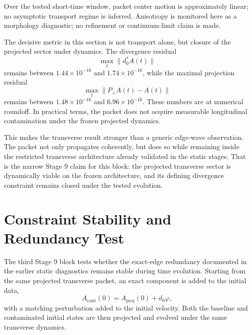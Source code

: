 \documentclass[11pt]{article}
\begin{document}
Over the tested short-time window, packet center motion is approximately linear; no asymptotic transport regime is inferred. Anisotropy is monitored here as a morphology diagnostic; no refinement or continuum-limit claim is made.

The decisive metric in this section is not transport alone, but closure of the projected sector under dynamics. The divergence residual
\begin{equation}
\max_t \|d_0^{*}A(t)\|
\end{equation}
remains between $1.44\times 10^{-16}$ and $1.74\times 10^{-16}$, while the maximal projection residual
\begin{equation}
\max_t \|P_{\perp}A(t)-A(t)\|
\end{equation}
remains between $1.48\times 10^{-16}$ and $6.96\times 10^{-16}$. These numbers are at numerical roundoff. In practical terms, the packet does not acquire measurable longitudinal contamination under the frozen projected dynamics.

This makes the transverse result stronger than a generic edge-wave observation. The packet not only propagates coherently, but does so while remaining inside the restricted transverse architecture already validated in the static stages. That is the narrow Stage 9 claim for this block: the projected transverse sector is dynamically viable on the frozen architecture, and its defining divergence constraint remains closed under the tested evolution.

\section{Constraint Stability and Redundancy Test}
The third Stage 9 block tests whether the exact-edge redundancy documented in the earlier static diagnostics remains stable during time evolution. Starting from the same projected transverse packet, an exact component is added to the initial data,
\begin{equation}
A_{\mathrm{cont}}(0) = A_{\mathrm{proj}}(0) + d_0\varphi,
\end{equation}
with a matching perturbation added to the initial velocity. Both the baseline and contaminated initial states are then projected and evolved under the same transverse dynamics.
\end{document}
